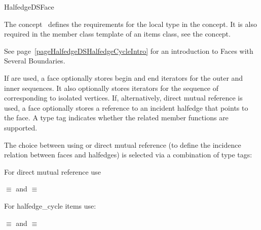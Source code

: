 
\ccRefPageBegin



\begin{ccRefConcept}{HalfedgeDSFace}
\label{pageHalfedgeDSItemsFaceRef}

\ccDefinition
  
The concept \ccRefName\ defines the requirements for the local  
type in the  concept. It is also required in 
the  member class template of an
items class, see the  concept.

See page~\ref{pageHalfedgeDSHalfedgeCycleIntro} for an introduction to Faces with Several Boundaries.

{\XHDS
If  are used, a face optionally stores begin and end iterators for the outer and inner  sequences. It also optionally stores iterators for the sequence of  corresponding to isolated vertices.
If, alternatively, direct mutual reference is used, a face optionally stores a reference 
to an incident halfedge that points to the face.
A type tag indicates whether the related member functions are supported. 
}

{\XHDS

The choice between using  or direct mutual reference
(to define the incidence relation between faces and halfedges) is selected 
via a combination of type tags:

For direct mutual reference use

 $\equiv$  
and
 $\equiv$  

For halfedge\_cycle items use:

 $\equiv$  
and
 $\equiv$  
 
}


\end{ccRefConcept}
